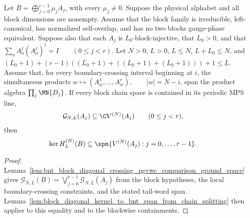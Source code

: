 \begin{lemma}
    \label{lem:block_diagonal_kernel_to_bnt_span_from_crossing_pgvwc_comparison}
    \leanok
    Let $B=\bigoplus_{j=0}^{r-1}\mu_jA_j$, with every $\mu_j\ne0$.
    Suppose the physical alphabet and all block dimensions are nonempty. Assume
    that the block family is irreducible, left-canonical, has normalized
    self-overlap, and has no two blocks gauge-phase equivalent. Suppose also
    that each $A_j$ is $L_0$-block-injective, that $L_0>0$, and that
    $\sum_a A^j_a(A^j_a)^\dagger =I \qquad (0\le j<r)$.
    Let $N>0$, $L>0$, $L\le N$, $L+L_0\le N$, and
    $(L_0+1) +(r-1)((L_0+1)+((L_0+1)+(L_0+1)))+1 \le L$.
    Assume that, for every boundary-crossing interval beginning at $i$, the
    simultaneous products
    $w\longmapsto(A^1_w,\ldots,A^r_w), \qquad |w|=N-i$,
    span the product algebra $\prod_j\MN{D_j}$. If every block chain space is
    contained in its periodic MPS line,
    \begin{align}
        \mathcal G_{N,L}(A_j)
         & \subseteq \C V^{(N)}(A_j)
        \qquad (0\le j<r), \notag
    \end{align}
    then
    \begin{align}
        \ker H_L^{(N)}(B)
         & \subseteq
        \spn\{V^{(N)}(A_j):j=0,\ldots,r-1\}. \notag
    \end{align}
\end{lemma}

\begin{proof}
    \leanok
    Lemma~\ref{lem:bnt_block_diagonal_crossing_pgvwc_comparison_ground_space}
    gives
    $\mathcal G_{N,L}(B) =\bigvee_{j=0}^{r-1}\mathcal G_{N,L}(A_j)$
    from the block hypotheses, the local boundary-crossing constraints, and the
    stated tail-word span.
    Lemma~\ref{lem:block_diagonal_kernel_to_bnt_span_from_chain_splitting}
    then applies to this equality and to the blockwise containments.
\end{proof}

